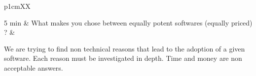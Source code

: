 \begin{longtable}{p{1cm}XX}
\hline

5 min & What makes you chose between equally potent softwares (equally priced) ? &
\begin{minipage}[t]{\linewidth}%
We are trying to find non technical reasons that lead to the adoption of a given software. Each reason must be investigated in depth. Time and money are non acceptable answers.
\end{minipage}\\[1cm]

\caption{Proposed themes and questions for a focus group on Regorus}
\label{proposedRoadmap}
\end{longtable}

